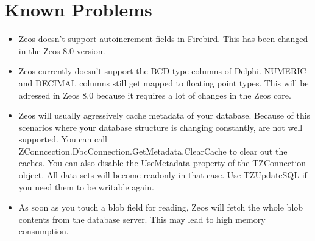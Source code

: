 \documentclass[a4paper,12pt,oneside]{book}
\begin{document}
\chapter{Known Problems}
\label{sec:Rev4_KnownProblems}
\begin{itemize}
\item
  Zeos doesn't support autoincrement fields in Firebird.
	This has been changed in the Zeos 8.0 version.
\item 
  Zeos currently doesn't support the BCD type columns of Delphi.
	NUMERIC and DECIMAL columns still get mapped to floating point types.
	This will be adressed in Zeos 8.0 because it requires a lot of changes in the Zeos core.
\item
  Zeos will usually agressively cache metadata of your database.
	Because of this scenarios where your database structure is changing constantly, are not well supported.
	You can call ZConncection.\-DbcConnection.\-GetMetadata.\-ClearCache to clear out the caches.
	You can also disable the UseMetadata property of the TZConnection object.
	All data sets will become readonly in that case.
	Use TZUpdateSQL if you need them to be writable again.
\item
  As soon as you touch a blob field for reading, Zeos will fetch the whole blob contents from the database server.
	This may lead to high memory consumption.
\end{itemize}
\end{document}
